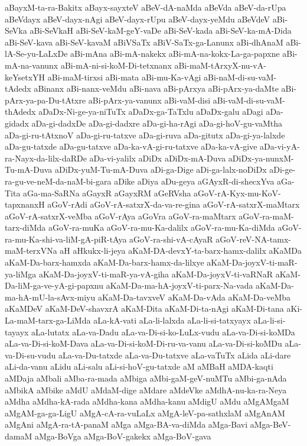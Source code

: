 {aBayxM-ta-ra-Bakitx
aBayx-sayxteV
aBeV-dA-naMda
aBeVda
aBeV-da-rUpa
aBeVdayx
aBeV-dayx-nAgi
aBeV-dayx-rUpu
aBeV-dayx-yeMdu
aBeVdeV
aBi-SeVka
aBi-SeVkaH
aBi-SeV-kaM-geY-vaDe
aBi-SeV-kada
aBi-SeV-ka-mA-Dida
aBi-SeV-kava
aBi-SeV-kavaM
aBiVSaTx
aBiV-SaTx-ga-Lanunx
aBi-dhAnaM
aBi-lA-Se-yu-LaLxDe
aBi-mAna
aBi-mA-nakekx
aBi-mA-na-kokx-La-ga-papxne
aBi-mA-na-vanunx
aBi-mA-ni-si-koM-Di-tetxnanx
aBi-maM-tArxyX-nu-vA-keYsetxYH
aBi-maM-tirxsi
aBi-mata
aBi-mu-Ka-vAgi
aBi-naM-di-su-vaM-tAdedx
aBinanx
aBi-nanx-veMdu
aBi-nava
aBi-pArxya
aBi-pArx-ya-daMte
aBi-pArx-ya-pa-Du-tAtxre
aBi-pArx-ya-vanunx
aBi-vaM-disi
aBi-vaM-di-su-vaM-thAdedx
aDaDx-Ni-ge-ya-niTuTx
aDaDx-ga-TaTxlu
aDaDx-galu
aDagi
aDa-gidadx
aDa-gi-dadxDe
aDa-gi-dadxre
aDa-gi-ha-rAgi
aDa-gi-hoV-gu-vaMtha
aDa-gi-ru-tAtxnoV
aDa-gi-ru-tatxve
aDa-gi-ruva
aDa-gitutx
aDa-gi-ya-lalxde
aDa-gu-tatxde
aDa-gu-tatxve
aDa-ka-vA-gi-ru-tatxve
aDa-ka-vA-give
aDa-vi-yA-ra-Nayx-da-lilx-daRDe
aDa-vi-yalilx
aDiDx
aDiDx-mA-Duva
aDiDx-ya-nunxM-Tu-mA-Duva
aDiDx-yuM-Tu-mA-Duva
aDi-ga-Dige
aDi-ga-lalx-noDiDx
aDi-ge-ra-gu-ve-neM-da-naM-bi-gara
aDike
aDiya
aDu-geya
aGAyxR-di-shecxYva
aGa-Tita
aGa-ma-SaRNa
aGayxR
aGayxRM
aGeRVsha
aGoV-rA-Kyx-mu-KoV-tapxnanxH
aGoV-rAdi
aGoV-rA-satxrX-da-va-re-gina
aGoV-rA-satxrX-maMtarx
aGoV-rA-satxrX-veMba
aGoV-rAya
aGoVra
aGoV-ra-maMtarx
aGoV-ra-maM-tarx-diMda
aGoV-ra-muKa
aGoV-ra-mu-Ka-dalilx
aGoV-ra-mu-Ka-diMda
aGoV-ra-mu-Ka-shi-va-liM-gA-piR-tAya
aGoV-ra-shi-vA-cAyaR
aGoV-reV-NA-tamx-maM-terxVNa
aH
aHkukx-li-jeya
aKaM-DA-devxY-ta-barx-hamx-dalilx
aKaMDa
aKaM-Da-barx-hamxda
aKaM-Da-barx-hamx-da-lilxye
aKaM-Da-joyxV-ti-maR-ya-liMga
aKaM-Da-joyxV-ti-maR-ya-vA-giha
aKaM-Da-joyxV-ti-vaRNaR
aKaM-Da-liM-ga-ve-yA-gi-papxnu
aKaM-Da-ma-hA-joyxV-ti-parx-Na-vada
aKaM-Da-ma-hA-mU-la-sAvx-miyu
aKaM-Da-tavxveV
aKaM-Da-vAda
aKaM-Da-veMba
aKaMDeV
aKaM-DeV-shavxrA
aKaM-Dita
aKaM-Di-ta-nAgi
aKaM-Di-tana
aKi-La-maM-tarx-ga-LiMda
aLa-kA-vati
aLa-li-lalxda
aLa-li-si-tatxyayx
aLa-li-si-tayayx
aLa-lutatx
aLa-va-Dadu
aLa-va-Di-si-ko-LuLx-vudu
aLa-va-Di-si-koMDa
aLa-va-Di-si-koM-Dava
aLa-va-Di-si-koM-Di-ru-va-vanu
aLa-va-Di-si-koMDu
aLa-va-Di-su-vudu
aLa-va-Du-tatxde
aLa-va-Du-tatxve
aLa-vaTuTx
aLida
aLi-dare
aLi-da-vanu
aLidu
aLi-salu
aLi-si-hoV-gu-tatxde
aM
aMBaH
aMDA-kaqti
aMDaja
aMbali
aMba-ra-mada
aMbiga
aMbi-gaM-geV-nuMTu
aMbi-ga-nAda
aMbikA
aMbike
aMdU
aMdaM-dige
aMdare
aMdeVke
aMdhA-nu-ka-ra-Neya
aMdha
aMdha-kA-rada
aMdha-kana
aMdha-kanu
aMdigU
aMdu
aMgAMgaM
aMgAM-ga-ga-LigU
aMgA-cA-ra-vuLaLx
aMgA-leV-pa-sathxlaM
aMgAnAM
aMgAni
aMgA-ra-tA-panaM
aMga
aMga-BA-va-diMda
aMga-Bavi
aMga-BeV-damaM
aMga-BoVga
aMga-BoV-gakekx
aMga-BoV-gava
}
